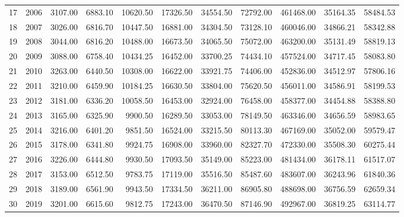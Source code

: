 \documentclass[12pt, letterpaper, leqno]{article}
\begin{document}
\begin{appendices}
\begin{table}[ht]
\begin{tabular}{rlrrrrrrrrr}
	  17 & 2006 & 3107.00 & 6883.10 & 10620.50 & 17326.50 & 34554.50 & 72792.00 & 461468.00 & 35164.35 & 58484.53 \\ 
	  18 & 2007 & 3026.00 & 6816.70 & 10447.50 & 16881.00 & 34304.50 & 73128.10 & 460046.00 & 34866.21 & 58342.88 \\ 
	  19 & 2008 & 3044.00 & 6816.20 & 10488.00 & 16673.50 & 34065.50 & 75072.00 & 463200.00 & 35131.49 & 58819.13 \\ 
	  20 & 2009 & 3088.00 & 6758.40 & 10434.25 & 16452.00 & 33700.25 & 74434.10 & 457524.00 & 34717.45 & 58083.80 \\ 
	  21 & 2010 & 3263.00 & 6440.50 & 10308.00 & 16622.00 & 33921.75 & 74406.00 & 452836.00 & 34512.97 & 57806.16 \\ 
	  22 & 2011 & 3210.00 & 6459.90 & 10184.25 & 16630.50 & 33804.00 & 75620.50 & 456011.00 & 34586.91 & 58199.53 \\ 
	  23 & 2012 & 3181.00 & 6336.20 & 10058.50 & 16453.00 & 32924.00 & 76458.00 & 458377.00 & 34454.88 & 58388.80 \\ 
	  24 & 2013 & 3165.00 & 6325.90 & 9900.50 & 16289.50 & 33053.00 & 78149.50 & 463346.00 & 34656.59 & 58983.65 \\ 
	  25 & 2014 & 3216.00 & 6401.20 & 9851.50 & 16524.00 & 33215.50 & 80113.30 & 467169.00 & 35052.00 & 59579.47 \\ 
	  26 & 2015 & 3178.00 & 6341.80 & 9924.75 & 16908.00 & 33960.00 & 82327.70 & 472330.00 & 35508.30 & 60275.44 \\ 
	  27 & 2016 & 3226.00 & 6444.80 & 9930.50 & 17093.50 & 35149.00 & 85223.00 & 481434.00 & 36178.11 & 61517.07 \\ 
	  28 & 2017 & 3153.00 & 6512.50 & 9783.75 & 17119.00 & 35516.50 & 85487.60 & 483607.00 & 36243.96 & 61840.36 \\ 
	  29 & 2018 & 3189.00 & 6561.90 & 9943.50 & 17334.50 & 36211.00 & 86905.80 & 488698.00 & 36756.59 & 62659.34 \\ 
	  30 & 2019 & 3201.00 & 6615.60 & 9812.75 & 17243.00 & 36470.50 & 87146.90 & 492967.00 & 36819.25 & 63114.77 \\ 
	   \hline
	\end{tabular}
	\end{table}
	

\end{appendices}
\end{document}

